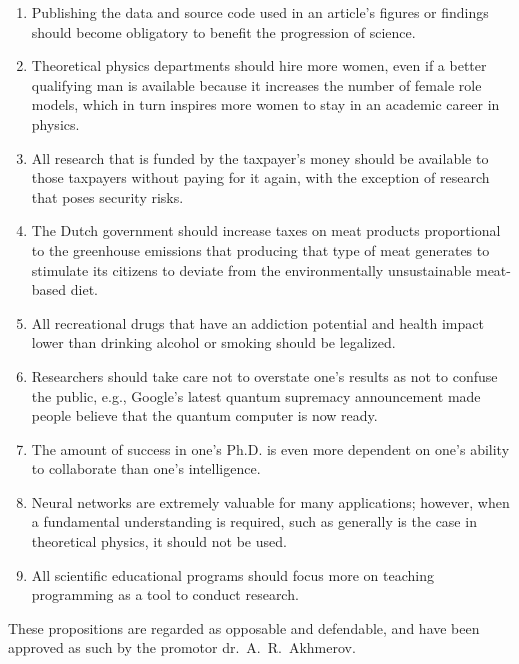 \documentclass{dissertation}
\begin{document}
\begin{enumerate}
\item Publishing the data and source code used in an article's figures or findings should become obligatory to benefit the progression of science.

\item Theoretical physics departments should hire more women, even if a better qualifying man is available because it increases the number of female role models, which in turn inspires more women to stay in an academic career in physics.

\item All research that is funded by the taxpayer's money should be available to those taxpayers without paying for it again, with the exception of research that poses security risks.

\item The Dutch government should increase taxes on meat products proportional to the greenhouse emissions that producing that type of meat generates to stimulate its citizens to deviate from the environmentally unsustainable meat-based diet.

\item All recreational drugs that have an addiction potential and health impact lower than drinking alcohol or smoking should be legalized.

\item Researchers should take care not to overstate one's results as not to confuse the public, e.g., Google's latest quantum supremacy announcement made people believe that the quantum computer is now ready.

\item The amount of success in one's Ph.D. is even more dependent on one's ability to collaborate than one's intelligence.

\item Neural networks are extremely valuable for many applications; however, when a fundamental understanding is required, such as generally is the case in theoretical physics, it should not be used.

\item All scientific educational programs should focus more on teaching programming as a tool to conduct research.

\end{enumerate}

\bigskip
\bigskip

\begin{center}
These propositions are regarded as opposable and defendable, and have been approved as such by the promotor  dr.\ A.\ R.\ Akhmerov.
\end{center}
\end{document}
